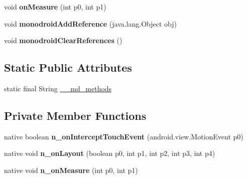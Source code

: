 \begin{DoxyCompactItemize}
void {\bfseries on\+Measure} (int p0, int p1)
\item 
\mbox{\label{classmd5b60ffeb829f638581ab2bb9b1a7f4f3f_1_1ViewCellRenderer__ViewCellContainer_abc30d10082a2bb9158e2576a2956d9b8}} 
void {\bfseries monodroid\+Add\+Reference} (java.\+lang.\+Object obj)
\item 
\mbox{\label{classmd5b60ffeb829f638581ab2bb9b1a7f4f3f_1_1ViewCellRenderer__ViewCellContainer_aae9ff83f231b0621942b6490e9b805d8}} 
void {\bfseries monodroid\+Clear\+References} ()
\end{DoxyCompactItemize}
\subsection*{Static Public Attributes}
\begin{DoxyCompactItemize}
\item 
static final String \hyperlink{classmd5b60ffeb829f638581ab2bb9b1a7f4f3f_1_1ViewCellRenderer__ViewCellContainer_a1f62af5d260be844bb21e32402dd820b}{\+\_\+\+\_\+md\+\_\+methods}
\end{DoxyCompactItemize}
\subsection*{Private Member Functions}
\begin{DoxyCompactItemize}
\item 
\mbox{\label{classmd5b60ffeb829f638581ab2bb9b1a7f4f3f_1_1ViewCellRenderer__ViewCellContainer_ac4d076bd301b00fc1b70cfc2f19ba95f}} 
native boolean {\bfseries n\+\_\+on\+Intercept\+Touch\+Event} (android.\+view.\+Motion\+Event p0)
\item 
\mbox{\label{classmd5b60ffeb829f638581ab2bb9b1a7f4f3f_1_1ViewCellRenderer__ViewCellContainer_a925a68f0ccfb7b59829a006aba8ff5f6}} 
native void {\bfseries n\+\_\+on\+Layout} (boolean p0, int p1, int p2, int p3, int p4)
\item 
\mbox{\label{classmd5b60ffeb829f638581ab2bb9b1a7f4f3f_1_1ViewCellRenderer__ViewCellContainer_a96ae769d8ff675310d41cbe5291e3424}} 
native void {\bfseries n\+\_\+on\+Measure} (int p0, int p1)
\end{DoxyCompactItemize}

